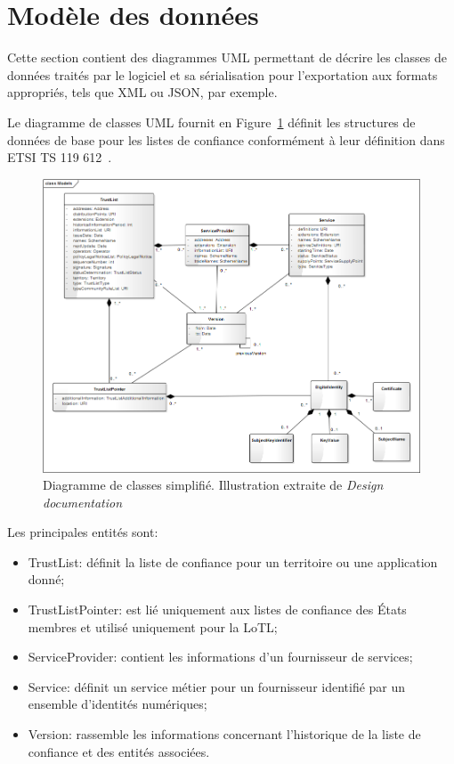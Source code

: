 \documentclass{tnreport}
\begin{document}
\section{Modèle des données}

Cette section contient des diagrammes UML permettant de décrire les classes de données traités par le logiciel et sa sérialisation pour l'exportation aux formats appropriés, tels que XML ou JSON, par exemple.

Le diagramme de classes UML fournit en Figure~\ref{fig:model} définit les structures de données de base pour les listes de confiance conformément à leur définition dans ETSI TS 119 612~\cite{ETSITS119612}.

\begin{figure}[h]
	\centering
	\includegraphics[scale=0.51]{figures/model}
	\caption{Diagramme de classes simplifié. Illustration extraite de \textit{Design documentation}~\cite{design-document}}
	\label{fig:model}
\end{figure}

Les principales entités sont:
\begin{itemize}
	\item TrustList: définit la liste de confiance pour un territoire ou une application donné;
	\item TrustListPointer: est lié uniquement aux listes de confiance des États membres et utilisé uniquement pour la LoTL;
	\item ServiceProvider: contient les informations d'un fournisseur de services;
	\item Service: définit un service métier pour un fournisseur identifié par un ensemble d'identités numériques;
	\item Version: rassemble les informations concernant l'historique de la liste de confiance et des entités associées.
\end{itemize}
\clearpage
\end{document}
